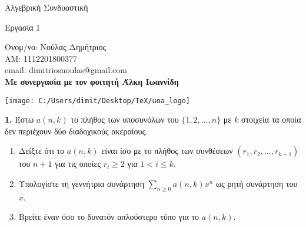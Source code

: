 \documentclass[oneside,a4paper]{article}
\newcommand {\tl}{\textlatin}
\begin{document}
	
	
	\begin{framed}	
		\begin{center}
			\huge Αλγεβρική Συνδυαστική
		\end{center}
		\begin{center}
			\huge Εργασία 1
		\end{center}
		\vspace{0.3truecm}
		\begin{center}
			Ονομ/νο: Νούλας Δημήτριος\\
			ΑΜ: 1112201800377\\
			\tl{email}: \tl{dimitriosnoulas@gmail.com} \\
			\textbf{Με συνεργασία με τον φοιτητή Άλκη Ιωαννίδη}
		\end{center}
		\vspace{0.3truecm}
	\end{framed}
	\vspace*{\fill}
	\begin{center}
	\texttt{[image: C:/Users/dimit/Desktop/TeX/uoa\_logo]}
	\end{center}
\vspace{1cm}
\pagebreak



\textbf{1.} Έστω $a(n,k)$ το πλήθος των υποσυνόλων του $\{1,2,\ldots,n\}$ με $k$ στοιχεία τα οποία δεν περιέχουν δύο διαδοχικούς ακεραίους.

\begin{enumerate}
	\item Δείξτε ότι το $a(n,k)$ είναι ίσο με το πλήθος των συνθέσεων $(r_1, r_2 ,\ldots, r_{k+1})$ του $n+1$ για τις οποίες $r_i \geq 2$ για $1<i\leq k$.
	\item Υπολογίστε τη γεννήτρια συνάρτηση $\sum\limits_{n\geq 0} a(n,k)x^n$ ως ρητή συνάρτηση του $x$.
	\item Βρείτε έναν όσο το δυνατόν απλούστερο τύπο για το $a(n,k)$.
\end{enumerate}
\end{document}
